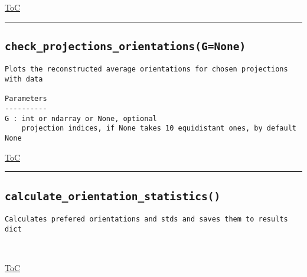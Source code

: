 \documentclass{article}
\begin{document}
\begin{flushright}

\hyperref[toc]{ToC}

\end{flushright}



\vspace{5mm}

\hrule

\subsection*{\texttt{check\_projections\_orientations(G=None)}}
\label{fun:checkprojectionsorientations}

\begin{lstlisting}[language=docstring]
Plots the reconstructed average orientations for chosen projections with data

Parameters
----------
G : int or ndarray or None, optional
    projection indices, if None takes 10 equidistant ones, by default None
\end{lstlisting}

\begin{flushright}

\hyperref[toc]{ToC}

\end{flushright}



\vspace{5mm}

\hrule

\subsection*{\texttt{calculate\_orientation\_statistics()}}
\label{fun:calculateorientationstatistics}

\begin{lstlisting}[language=docstring]
Calculates prefered orientations and stds and saves them to results dict

    
\end{lstlisting}

\begin{flushright}

\hyperref[toc]{ToC}

\end{flushright}
\end{document}
